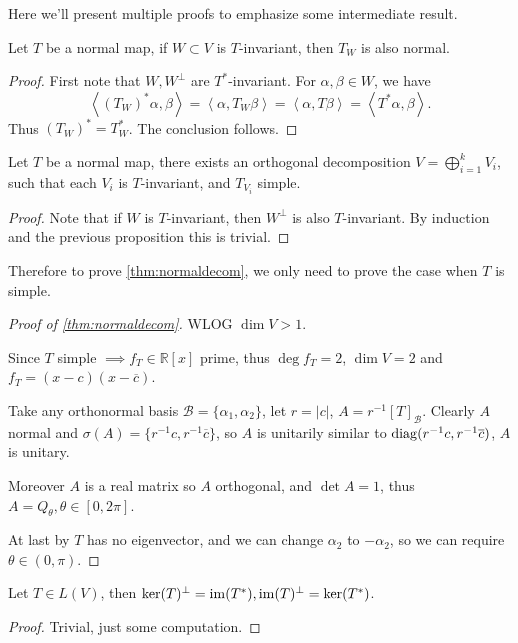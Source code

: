 Here we'll present multiple proofs to emphasize some
intermediate result.

\begin{proposition}
	Let $T$ be a normal map, if $W \subset V$ is $T$-invariant,
	then $T_W$ is also normal.
\end{proposition}
\begin{proof}[Proof]
    First note that $W, W^\perp$ are $T^*$-invariant.
	For $\alpha, \beta\in W$, we have
	\[
	\left<(T_W)^*\alpha, \beta \right> = \left<\alpha, T_W\beta \right>
	= \left<\alpha, T\beta \right> = \left<T^*\alpha, \beta \right>.
	\]
	Thus $(T_W)^* = T^*_W$. The conclusion follows.
\end{proof}

\begin{proposition}
	Let $T$ be a normal map, there exists an orthogonal decomposition
	$V = \bigoplus_{i=1}^k V_i$, such that each $V_i$ is $T$-invariant,
	and $T_{V_i}$ simple.
\end{proposition}
\begin{proof}[Proof]
    Note that if $W$ is $T$-invariant, then $W^\perp$ is
	also $T$-invariant.
	By induction and the previous proposition this is trivial.
\end{proof}

Therefore to prove \autoref{thm:normaldecom}, we only need to prove the case
when $T$ is simple.

\begin{proof}[Proof of \autoref{thm:normaldecom}]
    WLOG $\dim V > 1$.

	Since $T$ simple $ \implies f_T\in \mathbb{R}[x]$ prime,
	thus $\deg f_T = 2$, $\dim V = 2$ and $f_T = (x - c)(x - \overline{c})$.

	Take any orthonormal basis $\mathcal{B} = \{\alpha_1, \alpha_2\}$,
	let $r = |c|$, $A = r^{-1}[T]_{\mathcal{B}}$.
	Clearly $A$ normal and $\sigma(A) = \{r^{-1}c, r^{-1}\overline{c}\}$,
	so $A$ is unitarily similar to $\operatorname{diag}(r^{-1}c, r^{-1}\overline{c})$,
	$A$ is unitary.

	Moreover $A$ is a real matrix so $A$ orthogonal, and $\det A = 1$,
	thus $A = Q_\theta, \theta\in [0, 2\pi]$.

	At last by $T$ has no eigenvector, and we can change $\alpha_2$ to
	$-\alpha_2$, so we can require $\theta \in (0, \pi)$.
\end{proof}

\begin{proposition}
	Let $T\in L(V)$, then $\ker(T)^\perp = \operatorname{im}(T^*), \operatorname{im}(T)^\perp = \ker(T^*)$.
\end{proposition}
\begin{proof}[Proof]
    Trivial, just some computation.
\end{proof}

